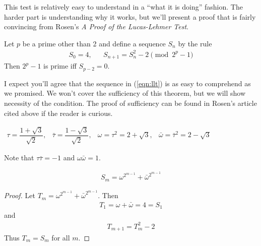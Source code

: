 This test is relatively easy to understand in a ``what it is doing'' fashion.  The harder part is understanding why it works, but we'll present a proof that is fairly convincing from Rosen's \emph{A Proof of the Lucas-Lehmer Test}\cite{rosen}.


\begin{thm} 
Let $p$ be a prime other than 2 and define a sequence $S_n$ by the rule
\begin{align}
\label{eqn:llt}
S_0 = 4,&&S_{n+1} = S_n^2 - 2 \pmod{2^p - 1}
\end{align}
Then $2^p - 1$ is prime iff $S_{p-2} = 0$.
\end{thm}

I expect you'll agree that the sequence in (\ref{eqn:llt}) is as easy to comprehend as we promised. We won't cover the sufficiency of this theorem, but we will show necessity of the condition. The proof of sufficiency can be found in Rosen's article cited above if the reader is curious.    
\begin{center}
\begin{math}
\begin{array}{cccc}
\tau = \dfrac{1 + \sqrt{3}}{\sqrt{2}},&
\bar{\tau} = \dfrac{1 - \sqrt{3}}{\sqrt{2}},&
\omega = \tau^2 = 2 + \sqrt{3},&
\bar{\omega} = \bar{\tau}^2 = 2 - \sqrt{3}
\end{array}
\end{math}
\end{center}

Note that $\tau\bar{\tau} = -1$ and $\omega\bar{\omega} = 1$.

\begin{lem}
\begin{align*}
S_m = \omega^{2^{m-1}}+ \bar{\omega}^{2^{m-1}}
\end{align*}
\end{lem}
\begin{proof}
Let $T_m = \omega^{2^{m-1}}+ \bar{\omega}^{2^{m-1}}$.  Then 
\begin{align*}
T_1 = \omega + \bar{\omega} = 4 = S_1
\end{align*}
 and 
\begin{align*}
T_{m+1} = T_m^2 -2  
\end{align*}
Thus $T_m = S_m$ for all $m$.
\end{proof}

